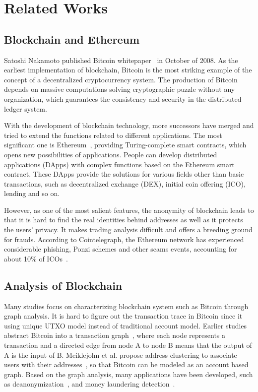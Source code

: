 
\section{Related Works}
\label{sec:relatedworks}
\subsection{Blockchain and Ethereum}
Satoshi Nakamoto published Bitcoin whitepaper~\cite{Nakamoto2008} in October of 2008. As the earliest implementation of blockchain, Bitcoin is the most striking example of the concept of a decentralized cryptocurrency system. The production of Bitcoin depends on massive computations solving cryptographic puzzle without any organization, which guarantees the consistency and security in the distributed ledger system.

With the development of blockchain technology, more successors have merged and tried to extend the functions related to different applications. The most significant one is Ethereum~\cite{buterin2013ethereum}, providing Turing-complete smart contracts, which opens new possibilities of applications. People can develop distributed applications (DApps) with complex functions based on the Ethereum smart contract. These DApps provide the solutions for various fields other than basic transactions, such as decentralized exchange (DEX), initial coin offering (ICO), lending and so on.

However, as one of the most salient features, the anonymity of blockchain leads to that it is hard to find the real identities behind addresses as well as it protects the users' privacy. It makes trading analysis difficult and offers a breeding ground for frauds. According to Cointelegraph, the Ethereum network has experienced considerable phishing, Ponzi schemes and other scams events, accounting for about 10\% of ICOs~\cite{cerchiello2018icos}.
\subsection{Analysis of Blockchain}
Many studies focus on characterizing blockchain system such as Bitcoin through graph analysis. It is hard to figure out the transaction trace in Bitcoin since it using unique UTXO model instead of traditional account model. Earlier studies abstract Bitcoin into a transaction graph~\cite{reid2013analysis}, where each node represents a transaction and a directed edge from node A to node B means that the output of A is the input of B. Meiklejohn et al. propose address clustering to associate users with their addresses~\cite{meiklejohn2013fistful}, so that Bitcoin can be modeled as an account based graph. Based on the graph analysis, many applications have been developed, such as deanonymization~\cite{reid2013analysis}, and money laundering detection~\cite{zhao2015graph,maesa2016analysis,ranshous2017exchange}. 

